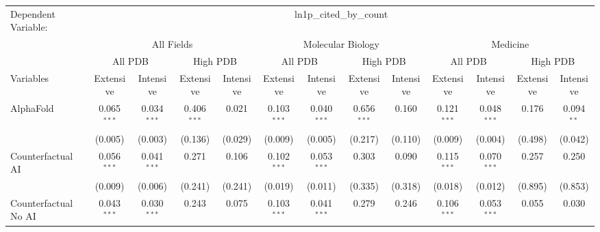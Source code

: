 \begingroup
\centering
\begin{tabular}{lcccccccccccc}
   \tabularnewline \midrule \midrule
   Dependent Variable: & \multicolumn{12}{c}{ln1p\_cited\_by\_count}\\
 & \multicolumn{4}{c}{All Fields} & \multicolumn{4}{c}{Molecular Biology} & \multicolumn{4}{c}{Medicine} \\
\cmidrule(lr){2-5} \cmidrule(lr){6-9} \cmidrule(lr){10-13}
 & \multicolumn{2}{c}{All PDB} & \multicolumn{2}{c}{High PDB} & \multicolumn{2}{c}{All PDB} & \multicolumn{2}{c}{High PDB} & \multicolumn{2}{c}{All PDB} & \multicolumn{2}{c}{High PDB} \\
\cmidrule(lr){2-3} \cmidrule(lr){4-5} \cmidrule(lr){6-7} \cmidrule(lr){8-9} \cmidrule(lr){10-11} \cmidrule(lr){12-13}
Variables & \multicolumn{1}{c}{Extensive} & \multicolumn{1}{c}{Intensive} & \multicolumn{1}{c}{Extensive} & \multicolumn{1}{c}{Intensive} & \multicolumn{1}{c}{Extensive} & \multicolumn{1}{c}{Intensive} & \multicolumn{1}{c}{Extensive} & \multicolumn{1}{c}{Intensive} & \multicolumn{1}{c}{Extensive} & \multicolumn{1}{c}{Intensive} & \multicolumn{1}{c}{Extensive} & \multicolumn{1}{c}{Intensive} \\
\cmidrule(lr){1-1}\cmidrule(lr){2-2} \cmidrule(lr){3-3} \cmidrule(lr){4-4} \cmidrule(lr){5-5} \cmidrule(lr){6-6} \cmidrule(lr){7-7} \cmidrule(lr){8-8} \cmidrule(lr){9-9} \cmidrule(lr){10-10} \cmidrule(lr){11-11} \cmidrule(lr){12-12} \cmidrule(lr){13-13}
   AlphaFold                                & 0.065$^{***}$ & 0.034$^{***}$ & 0.406$^{***}$ & 0.021   & 0.103$^{***}$ & 0.040$^{***}$  & 0.656$^{***}$ & 0.160   & 0.121$^{***}$ & 0.048$^{***}$  & 0.176   & 0.094$^{**}$\\   
                                            & (0.005)       & (0.003)       & (0.136)       & (0.029) & (0.009)       & (0.005)        & (0.217)       & (0.110) & (0.009)       & (0.004)        & (0.498) & (0.042)\\   
   Counterfactual AI                        & 0.056$^{***}$ & 0.041$^{***}$ & 0.271         & 0.106   & 0.102$^{***}$ & 0.053$^{***}$  & 0.303         & 0.090   & 0.115$^{***}$ & 0.070$^{***}$  & 0.257   & 0.250\\   
                                            & (0.009)       & (0.006)       & (0.241)       & (0.241) & (0.019)       & (0.011)        & (0.335)       & (0.318) & (0.018)       & (0.012)        & (0.895) & (0.853)\\   
   Counterfactual No AI                     & 0.043$^{***}$ & 0.030$^{***}$ & 0.243         & 0.075   & 0.103$^{***}$ & 0.041$^{***}$  & 0.279         & 0.246   & 0.106$^{***}$ & 0.053$^{***}$  & 0.055   & 0.030\\   

\end{tabular}
